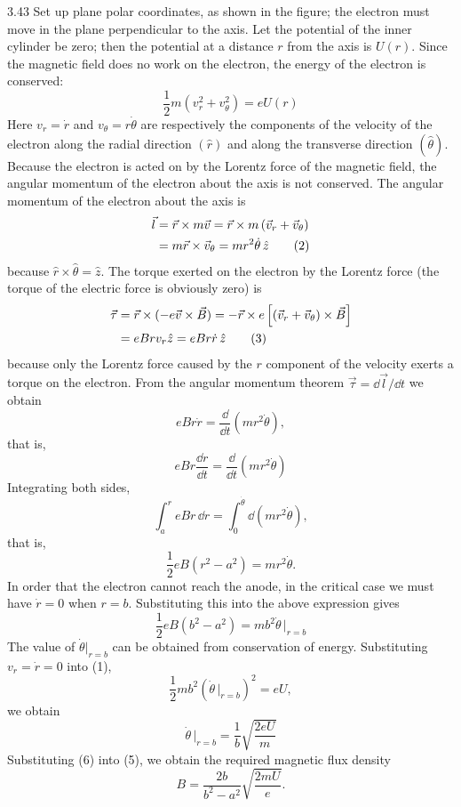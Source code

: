 \begin{solution}{3.43}
Set up plane polar coordinates, as shown in the figure; the electron must move in the plane perpendicular to the axis. Let the potential of the inner cylinder be zero; then the potential at a distance $r$ from the axis is $U(r)$. Since the magnetic field does no work on the electron, the energy of the electron is conserved:
\begin{equation}
\frac{1}{2}m\left(v_r^2+v_\theta^2\right)=eU(r) \tag{1}
\end{equation}
Here $v_r=\dot{r}$ and $v_\theta=r\dot{\theta}$ are respectively the components of the velocity of the electron along the radial direction $(\hat{r})$ and along the transverse direction $(\hat{\theta})$. Because the electron is acted on by the Lorentz force of the magnetic field, the angular momentum of the electron about the axis is not conserved. The angular momentum of the electron about the axis is
\begin{align}
\vec{l} &= \vec{r}\times m\vec{v}=\vec{r}\times m\left(\vec{v}_r+\vec{v}_\theta\right)\notag\\
&= m\vec{r}\times\vec{v}_\theta=mr^2\dot{\theta}\,\hat{z} \tag{2}
\end{align}
because $\hat{r}\times\hat{\theta}=\hat{z}$. The torque exerted on the electron by the Lorentz force (the torque of the electric force is obviously zero) is
\begin{align}
\vec{\tau} &= \vec{r}\times(-e\vec{v}\times\vec{B})=-\vec{r}\times e\left[\left(\vec{v}_r+\vec{v}_\theta\right)\times\vec{B}\right]\notag\\
&= eBrv_r\hat{z}=eBr\dot{r}\,\hat{z} \tag{3}
\end{align}
because only the Lorentz force caused by the $r$ component of the velocity exerts a torque on the electron. From the angular momentum theorem $\vec{\tau}=\dd\vec{l}/\dd t$ we obtain
\[
eBr\dot{r}=\frac{\dd}{\dd t}\left(mr^2\dot{\theta}\right),
\]
that is,
\begin{equation}
eBr\frac{\dd r}{\dd t}=\frac{\dd}{\dd t}\left(mr^2\dot{\theta}\right) \tag{4}
\end{equation}
Integrating both sides,
\[
\int_a^r eBr\,\dd r=\int_0^{\dot{\theta}}\dd\left(mr^2\dot{\theta}\right),
\]
that is,
\[
\frac{1}{2}eB\left(r^2-a^2\right)=mr^2\dot{\theta}.
\]
In order that the electron cannot reach the anode, in the critical case we must have $\dot{r}=0$ when $r=b$. Substituting this into the above expression gives
\begin{equation}
\frac{1}{2}eB\left(b^2-a^2\right)=mb^2\dot{\theta}\,\big|_{r=b} \tag{5}
\end{equation}
The value of $\dot{\theta}|_{r=b}$ can be obtained from conservation of energy. Substituting $v_r=\dot{r}=0$ into (1),
\[
\frac{1}{2}mb^2\left(\dot{\theta}\,\big|_{r=b}\right)^2=eU,
\]
we obtain
\begin{equation}
\dot{\theta}\,\big|_{r=b}=\frac{1}{b}\sqrt{\frac{2eU}{m}} \tag{6}
\end{equation}
Substituting (6) into (5), we obtain the required magnetic flux density
\[
B=\frac{2b}{b^2-a^2}\sqrt{\frac{2mU}{e}}.
\]


\end{solution}
